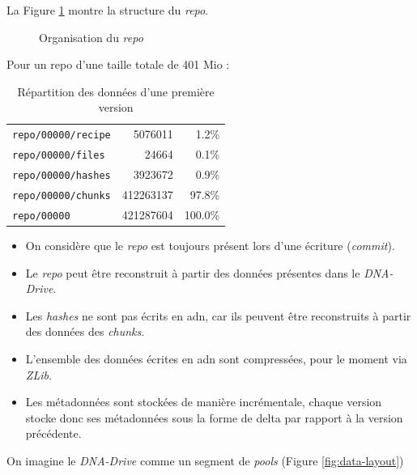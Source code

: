 \documentclass[a4paper]{report}
\begin{document}
La Figure \ref{fig:repo-dir-tree} montre la structure du \emph{repo}. 

\begin{figure}
\caption{Organisation du \emph{repo}}
\label{fig:repo-dir-tree}
\end{figure}

Pour un repo d'une taille totale de 401 Mio :

\begin{table}[ht]
\centering
\begin{tabular}{l r r}
\verb|repo/00000/recipe| &   5076011 &   1.2\% \\
\verb|repo/00000/files| &      24664 &   0.1\% \\
\verb|repo/00000/hashes| &   3923672 &   0.9\% \\
\verb|repo/00000/chunks| & 412263137 &  97.8\% \\
\verb|repo/00000| &        421287604 & 100.0\% \\
\end{tabular}
\caption{Répartition des données d'une première version}
\label{fig:repo-data-distribution}
\end{table}

\begin{itemize}
\item
  On considère que le \emph{repo} est toujours présent lors d'une
  écriture (\emph{commit}).
\item
  Le \emph{repo} peut être reconstruit à partir des données présentes
  dans le \emph{DNA-Drive}.
\item
  Les \emph{hashes} ne sont pas écrits en \ac{adn}, car ils peuvent être
  reconstruits à partir des données des \emph{chunks}.
\item
  L'ensemble des données écrites en \ac{adn} sont compressées, pour le moment
  via \emph{ZLib}.
\item
  Les métadonnées sont stockées de manière incrémentale, chaque version
  stocke donc ses métadonnées sous la forme de delta par rapport à la
  version précédente.
\end{itemize}

On imagine le \emph{DNA-Drive} comme un segment de \emph{pools} (Figure \ref{fig:data-layout})
\end{document}
